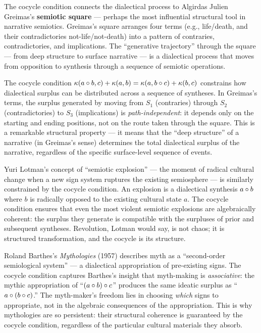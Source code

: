 \begin{interpretation}
\label{interp:ch16:greimas_semiotic_square}
The cocycle condition connects the dialectical process to Algirdas Julien
Greimas's \textbf{semiotic square} --- perhaps the most influential
structural tool in narrative semiotics.  Greimas's square arranges four
terms (e.g., life/death, and their contradictories not-life/not-death)
into a pattern of contraries, contradictories, and implications.  The
``generative trajectory'' through the square --- from deep structure to
surface narrative --- is a dialectical process that moves from opposition
to synthesis through a sequence of semiotic operations.

The cocycle condition $\kappa(a \circ b, c) + \kappa(a,b) =
\kappa(a, b \circ c) + \kappa(b,c)$ constrains how dialectical
surplus can be distributed across a sequence of syntheses.  In Greimas's
terms, the surplus generated by moving from $S_1$ (contraries) through
$S_2$ (contradictories) to $S_3$ (implications) is \emph{path-independent}:
it depends only on the starting and ending positions, not on the route
taken through the square.  This is a remarkable structural property ---
it means that the ``deep structure'' of a narrative (in Greimas's sense)
determines the total dialectical surplus of the narrative, regardless of
the specific surface-level sequence of events.

Yuri Lotman's concept of ``semiotic explosion'' --- the moment of radical
cultural change when a new sign system ruptures the existing semiosphere
--- is similarly constrained by the cocycle condition.  An explosion is a
dialectical synthesis $a \circ b$ where $b$ is radically opposed to the
existing cultural state $a$.  The cocycle condition ensures that even the
most violent semiotic explosions are algebraically coherent: the surplus
they generate is compatible with the surpluses of prior and subsequent
syntheses.  Revolution, Lotman would say, is not chaos; it is structured
transformation, and the cocycle is its structure.
\end{interpretation}

\begin{remark}
\label{interp:ch16:barthes_mythologies}
Roland Barthes's \textit{Mythologies} (1957) describes myth as a
``second-order semiological system'' --- a dialectical appropriation of
pre-existing signs.  The cocycle condition captures Barthes's insight
that myth-making is \emph{associative}: the mythic appropriation of
``$(a \circ b) \circ c$'' produces the same ideatic surplus as
``$a \circ (b \circ c)$.''  The myth-maker's freedom lies in choosing
\emph{which} signs to appropriate, not in the algebraic consequences of
the appropriation.  This is why mythologies are so persistent: their
structural coherence is guaranteed by the cocycle condition, regardless
of the particular cultural materials they absorb.
\end{remark}

